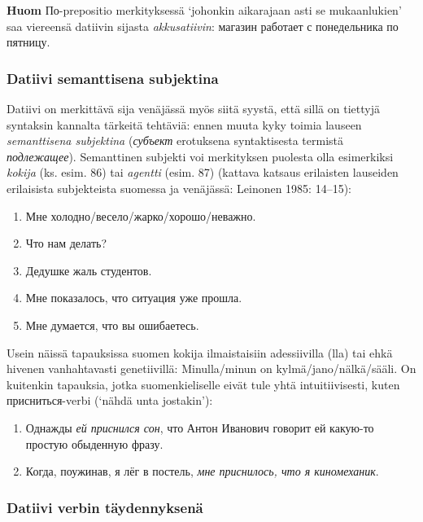 \documentclass[]{scrartcl}
\providecommand{\tightlist}{%
  \setlength{\itemsep}{0pt}\setlength{\parskip}{0pt}}
\begin{document}
\textbf{Huom} По-prepositio merkityksessä `johonkin aikarajaan asti se
mukaanlukien' saa viereensä datiivin sijasta \emph{akkusatiivin}:
магазин работает с понедельника по пятницу.

\subsubsection{Datiivi semanttisena
subjektina}\label{datiivi-semanttisena-subjektina}

Datiivi on merkittävä sija venäjässä myös siitä syystä, että sillä on
tiettyjä syntaksin kannalta tärkeitä tehtäviä: ennen muuta kyky toimia
lauseen \emph{semanttisena subjektina} (\emph{субъект} erotuksena
syntaktisesta termistä \emph{подлежащее}). Semanttinen subjekti voi
merkityksen puolesta olla esimerkiksi \emph{kokija} (ks. esim. 86) tai
\emph{agentti} (esim. 87) (kattava katsaus erilaisten lauseiden
erilaisista subjekteista suomessa ja venäjässä: Leinonen 1985: 14--15):

\begin{enumerate}
\def\labelenumi{(\arabic{enumi})}
\setcounter{enumi}{85}
\tightlist
\item
  Мне холодно/весело/жарко/хорошо/неважно.
\item
  Что нам делать?
\item
  Дедушке жаль студентов.
\item
  Мне показалось, что ситуация уже прошла.
\item
  Мне думается, что вы ошибаетесь.
\end{enumerate}

Usein näissä tapauksissa suomen kokija ilmaistaisiin adessiivilla (lla)
tai ehkä hivenen vanhahtavasti genetiivillä: Minulla/minun on
kylmä/jano/nälkä/sääli. On kuitenkin tapauksia, jotka suomenkieliselle
eivät tule yhtä intuitiivisesti, kuten присниться-verbi (`nähdä unta
jostakin'):

\begin{enumerate}
\def\labelenumi{(\arabic{enumi})}
\setcounter{enumi}{90}
\tightlist
\item
  Однажды \emph{ей приснился сон}, что Антон Иванович говорит ей
  какую-то простую обыденную фразу.
\item
  Когда, поужинав, я лёг в постель, \emph{мне приснилось, что я
  киномеханик}.
\end{enumerate}

\subsubsection{Datiivi verbin
täydennyksenä}\label{datiivi-verbin-tuxe4ydennyksenuxe4}
\end{document}

